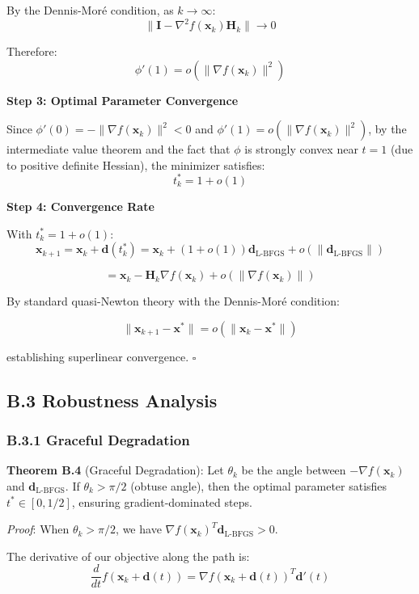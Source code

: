 By the Dennis-Moré condition, as \(k \to \infty\):
\[\|\mathbf{I} - \nabla^2 f(\mathbf{x}_k)\mathbf{H}_k\| \to 0\]

Therefore:
\[\phi'(1) = o(\|\nabla f(\mathbf{x}_k)\|^2)\]

\textbf{Step 3: Optimal Parameter Convergence}

Since \(\phi'(0) = -\|\nabla f(\mathbf{x}_k)\|^2 < 0\) and \(\phi'(1) = o(\|\nabla f(\mathbf{x}_k)\|^2)\), by the intermediate value theorem and the fact that \(\phi\) is strongly convex near \(t = 1\) (due to positive definite Hessian), the minimizer satisfies:
\[t_k^* = 1 + o(1)\]

\textbf{Step 4: Convergence Rate}

With \(t_k^* = 1 + o(1)\):
\[\mathbf{x}_{k+1} = \mathbf{x}_k + \mathbf{d}(t_k^*) = \mathbf{x}_k + (1 + o(1))\mathbf{d}_{\text{L-BFGS}} + o(\|\mathbf{d}_{\text{L-BFGS}}\|)\]

\[= \mathbf{x}_k - \mathbf{H}_k\nabla f(\mathbf{x}_k) + o(\|\nabla f(\mathbf{x}_k)\|)\]

By standard quasi-Newton theory with the Dennis-Moré condition:

\[\|\mathbf{x}_{k+1} - \mathbf{x}^*\| = o(\|\mathbf{x}_k - \mathbf{x}^*\|)\]

establishing superlinear convergence. \(\square\)

\hypertarget{b.3-robustness-analysis}{%
\subsection{B.3 Robustness Analysis}\label{b.3-robustness-analysis}}

\hypertarget{b.3.1-graceful-degradation}{%
\subsubsection{B.3.1 Graceful Degradation}\label{b.3.1-graceful-degradation}}

\textbf{Theorem B.4} (Graceful Degradation): Let \(\theta_k\) be the angle between \(-\nabla f(\mathbf{x}_k)\) and \(\mathbf{d}_{\text{L-BFGS}}\). If \(\theta_k > \pi/2\) (obtuse angle), then the optimal parameter satisfies \(t^* \in [0, 1/2]\), ensuring gradient-dominated steps.

\emph{Proof}: When \(\theta_k > \pi/2\), we have \(\nabla f(\mathbf{x}_k)^T \mathbf{d}_{\text{L-BFGS}} > 0\).

The derivative of our objective along the path is:
\[\frac{d}{dt}f(\mathbf{x}_k + \mathbf{d}(t)) = \nabla f(\mathbf{x}_k + \mathbf{d}(t))^T \mathbf{d}'(t)\]


